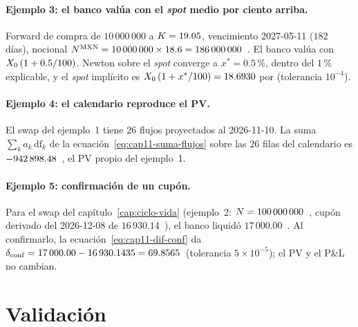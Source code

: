 \paragraph{Ejemplo 3: el banco valúa con el \emph{spot} medio por ciento arriba.} Forward de compra de $10\,000\,000$ \USD a $\K = 19.05$, vencimiento 2027-05-11 ($182$ días), nocional $N^{\MXN} = 10\,000\,000 \times 18.6 = 186\,000\,000$~\MXN. El banco valúa con $\Spot\,(1 + 0.5/100)$. Newton sobre el \emph{spot} converge a $x^{*} = 0.5\,\%$, dentro del $1\,\%$ explicable, y el \emph{spot} implícito es $\Spot\,(1 + x^{*}/100) = \verif{cap11-spot-implicito}{18.6930}$ \MXN por \USD (tolerancia $10^{-4}$).

\paragraph{Ejemplo 4: el calendario reproduce el PV.} El swap del ejemplo~1 tiene $26$ flujos proyectados al 2026-11-10. La suma $\sum_k a_k\,\mathrm{df}_k$ de la ecuación~\eqref{eq:cap11-suma-flujos} sobre las $26$ filas del calendario es $\verif{cap11-suma-flujos-pv}{-942898.48}$~\MXN, el PV propio del ejemplo~1.

\paragraph{Ejemplo 5: confirmación de un cupón.} Para el swap del capítulo~\ref{cap:ciclo-vida} (ejemplo~2: $\Nom = 100\,000\,000$~\MXN, cupón derivado del 2026-12-08 de $16\,930.14$~\MXN), el banco liquidó $17\,000.00$~\MXN. Al confirmarlo, la ecuación~\eqref{eq:cap11-dif-conf} da $\delta_{\mathrm{conf}} = 17\,000.00 - 16\,930.1435 = \verif{cap11-dif-confirmada}{69.8565}$~\MXN (tolerancia $5\times 10^{-5}$); el PV y el P\&L no cambian.

\section{Validación}\label{sec:cap11-validacion}

